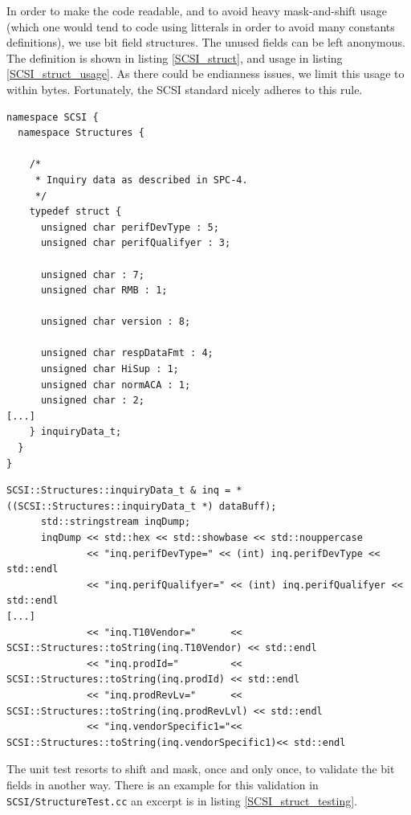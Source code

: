 In order to make the code readable, and to avoid heavy mask-and-shift usage (which one would tend
to code using litterals in order to avoid many constants definitions), we use bit field structures.
The unused fields can be left anonymous.
The definition is shown in listing \ref{SCSI_struct}, and usage in listing \ref{SCSI_struct_usage}.
As there could be endianness issues, we limit this usage to within bytes. Fortunately, the SCSI 
standard nicely adheres to this rule.

\begin{table}[h]
\begin{lstlisting}[caption=SCSI::Structures example,label=SCSI_struct]
namespace SCSI {
  namespace Structures {

    /*
     * Inquiry data as described in SPC-4.
     */
    typedef struct {
      unsigned char perifDevType : 5;
      unsigned char perifQualifyer : 3;

      unsigned char : 7;
      unsigned char RMB : 1;

      unsigned char version : 8;

      unsigned char respDataFmt : 4;
      unsigned char HiSup : 1;
      unsigned char normACA : 1;
      unsigned char : 2;
[...]
    } inquiryData_t;
  }
}
\end{lstlisting}
\end{table}

\begin{table}[h]
\begin{lstlisting}[caption=SCSI::Structures usage example,label=SCSI_struct_usage]
      SCSI::Structures::inquiryData_t & inq = *((SCSI::Structures::inquiryData_t *) dataBuff);
      std::stringstream inqDump;
      inqDump << std::hex << std::showbase << std::nouppercase
              << "inq.perifDevType=" << (int) inq.perifDevType << std::endl
              << "inq.perifQualifyer=" << (int) inq.perifQualifyer << std::endl
[...]
              << "inq.T10Vendor="      << SCSI::Structures::toString(inq.T10Vendor) << std::endl
              << "inq.prodId="         << SCSI::Structures::toString(inq.prodId) << std::endl
              << "inq.prodRevLv="      << SCSI::Structures::toString(inq.prodRevLvl) << std::endl
              << "inq.vendorSpecific1="<< SCSI::Structures::toString(inq.vendorSpecific1)<< std::endl
\end{lstlisting}
\end{table}

The unit test resorts to shift and mask, once and only once, to validate the bit fields in
another way. There is an example for this validation in \verb#SCSI/StructureTest.cc# an excerpt is in listing \ref{SCSI_struct_testing}.

